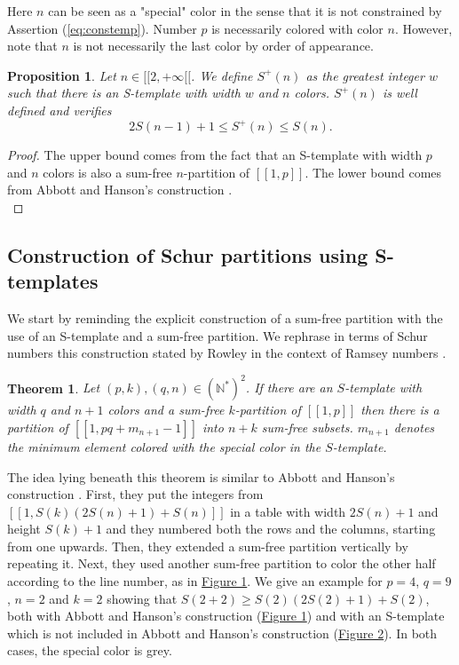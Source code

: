 \documentclass{article}
\newtheorem{theorem}[definition]{Theorem}
\newtheorem{computational theorem}[definition]{Computational Theorem}
\newtheorem{proposition}[definition]{Proposition}
\begin{document}
Here \(n\) can be seen as a "special" color in the sense that it is not constrained by Assertion (\ref{eq:constemp}).
Number \(p\) is necessarily colored with color \(n\). However, note that \(n\) is not necessarily the last color by order of appearance.


\begin{proposition}
	Let \(n \in [\![2, +\infty[\![\). We define \(S^+(n)\) as the greatest integer \(w\) such that there is an S-template with 
	width \(w\) and \(n\) colors. 
	\(S^+(n)\) is well defined and verifies
	\[
	2S(n-1)+1 \leqslant S^+(n) \leqslant S(n).
	\]
\end{proposition}

\begin{proof}
The upper bound comes from the fact that an S-template with width \(p\) and \(n\) colors is also a sum-free \(n\)-partition 
of \([\![1, p]\!]\). The lower bound comes from Abbott and Hanson's construction \cite{AbbottHanson}. \\
\end{proof}


\subsection{Construction of Schur partitions using S-templates}

We start by reminding the explicit construction of a sum-free partition with the use of an S-template and a sum-free partition. 
We rephrase in terms of Schur numbers this construction stated by Rowley in the context of Ramsey numbers \cite{RowleyRamsey}.

\begin{theorem}
\label{thm:Stemp}
	Let \((p,k), (q,n) \in (\mathbb{N}^*)^2\). If there are an \(S\)-template with width \(q\) and \(n+1\) colors 
	and a sum-free \(k\)-partition of \([\![1,p]\!]\) then there is a partition of \([\![1,pq+m_{n+1}
	-1]\!]\) into \(n+k\) sum-free subsets. \(m_{n+1}\) denotes the minimum element colored with the special color in the \(S\)-template.
\end{theorem}

The idea lying beneath this theorem is similar to Abbott and Hanson's construction \cite{AbbottHanson}. First, they
put the integers from \([\![1,S(k)(2S(n)+1)+S(n)]\!]\) in a table with width \(2S(n)+1\) and height \(S(k)+1\) and they 
numbered both the rows and the columns, starting from one upwards. Then, they 
extended a sum-free partition vertically by repeating it. Next, they used another sum-free partition to color the other half according 
to the line number, as in \hyperref[figure:1]{Figure 1}. We give an example for \(p = 4\), 
\(q = 9\), \(n = 2\) and \(k = 2\) showing that \(S(2 + 2) \geqslant S(2) \left(2 S(2) + 1\right) + S(2)\), both with Abbott and 
Hanson's construction (\hyperref[figure:1]{Figure 1}) and with an S-template which is not included in Abbott and Hanson's construction 
(\hyperref[figure:2]{Figure 2}). In both cases, the special color is grey.
\end{document}
